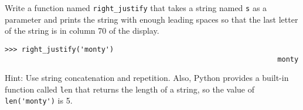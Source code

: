 \documentclass[
DIV=11,
fontsize=13,
twoside,
headinclude=false,
titlepage=firstiscover,
abstract=true,
headsepline=true,
footsepline=true,
chapterprefix=true, %
headings=big,
bibliography=totoc,%
captions=tableheading
]{scrbook}
\theoremstyle{definition}
\begin{document}
\begin{exercise}
\normalfont
{}

Write a function named \verb"right_justify" that takes a string
named {\texttt s} as a parameter and prints the string with enough
leading spaces so that the last letter of the string is in column 70
of the display.

\begin{lstlisting}
>>> right_justify('monty')
                                                                 monty
\end{lstlisting}

Hint: Use string concatenation and repetition.  Also,
Python provides a built-in function called {\texttt len} that
returns the length of a string, so the value of \verb"len('monty')" is 5.

\end{exercise}
\end{document}
